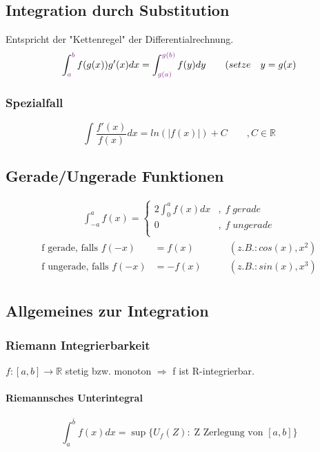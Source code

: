 \documentclass[12pt,a4paper]{article}%
\numberwithin{equation}{section}
\newcommand{\R}{\mathbb{R}} %
\newcommand{\subsubsubsection}{\paragraph}
\def\colBord#1{\begingroup\color{Fuchsia}{#1}\endgroup}
\numberwithin{equation}{subsection}
\begin{document}
\subsection{Integration durch Substitution}
Entspricht der "Kettenregel" der Differentialrechnung.
\begin{equation}
\int_{\colBord{a}}^{\colBord{b}} f(g(x))g'(x) dx = \int_{\colBord{g(a)}}^{\colBord{g(b)}} f(y) dy \qquad (setze \quad y = g(x) \label{eq:rule_subs}
\end{equation}

\subsubsection{Spezialfall}
\begin{equation}
\int \frac{f'(x)}{f(x)} dx = ln(|f(x)|) + C \qquad ,C\in\R \label{eq:rule_spec}
\end{equation}

\subsection{Gerade/Ungerade Funktionen}
\begin{align}
\int_{-a}^a f(x) = 
\begin{cases}
2 \int_0^a f(x) dx &,\; f\; gerade\\
0 &,\; f\; ungerade\\
\end{cases} \label{eq:evenodd}
\end{align}
\begin{align*}
\text{f gerade, falls }f(-x) &= f(x) \qquad &(z.B.: cos(x), x^2)\\
\text{f ungerade, falls }f(-x) &= -f(x) \qquad &(z.B.: sin(x), x^3)\\
\end{align*}

\subsection{Allgemeines zur Integration}
\subsubsection{Riemann Integrierbarkeit}
$f:[a,b] \rightarrow \R$ stetig bzw. monoton \newline
$\Rightarrow$ f ist R-integrierbar.

\subsubsubsection{Riemannsches Unterintegral}
\begin{equation}
\int_{a}^{\bar{b}} f(x) dx = \sup\{U_f(Z): \; \text{Z Zerlegung von }[a,b]\}
\end{equation}
\end{document}
